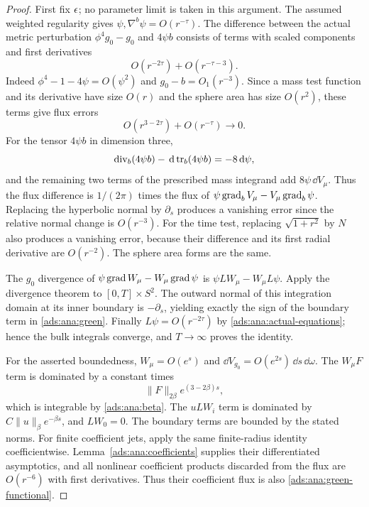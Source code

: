 \begin{proof}
First fix $\epsilon$; no parameter limit is taken in this argument.
The assumed weighted regularity gives
$\psi,\nabla^b\psi=O(r^{-\tau})$.  The difference between the actual
metric perturbation $\phi^4g_0-g_0$ and $4\psi b$ consists of terms
with scaled components and first derivatives
\[
 O(r^{-2\tau})+O(r^{-\tau-3}).
\]
Indeed $\phi^4-1-4\psi=O(\psi^2)$ and
$g_0-b=O_1(r^{-3})$.  Since a mass test function and its derivative
have size $O(r)$ and the sphere area has size $O(r^2)$, these terms
give flux errors
\begin{equation}
 O(r^{3-2\tau})+O(r^{-\tau})\longrightarrow0.
 \label{ads:ana:flux-errors}
\end{equation}
For the tensor $4\psi b$ in dimension three,
\[
 \operatorname{div}_b(4\psi b)-\,\mathrm d\operatorname{tr}_b(4\psi b)=-8\,\mathrm d\psi,
\]
and the remaining two terms of the prescribed mass integrand add
$8\psi\,\dd V_\mu$.  Thus the flux difference is $1/(2\pi)$ times
the flux of $\psi\operatorname{grad}_bV_\mu-V_\mu\operatorname{grad}_b\psi$.
Replacing the hyperbolic normal by $\partial_s$ produces a vanishing
error since the relative normal change is $O(r^{-3})$.
For the time test, replacing $\sqrt{1+r^2}$ by $N$ also produces a
vanishing error, because their difference and its first radial
derivative are $O(r^{-2})$.  The sphere area forms are the same.

The $g_0$ divergence of
$\psi\operatorname{grad} W_\mu-W_\mu\operatorname{grad}\psi$ is
$\psi LW_\mu-W_\mu L\psi$.  Apply the divergence theorem to
$[0,T]\times S^2$.  The outward normal of this integration domain
at its inner boundary is $-\partial_s$, yielding exactly the sign of
the boundary term in \eqref{ads:ana:green}.  Finally
$L\psi=O(r^{-2\tau})$ by \eqref{ads:ana:actual-equations}; hence the
bulk integrals converge, and $T\to\infty$ proves the identity.

For the asserted boundedness, $W_\mu=O(e^s)$ and
$\dd V_{g_0}=O(e^{2s})\,\dd s\,\dd\omega$.
The $W_\mu F$ term is dominated by a constant times
\[
 \|F\|_{2\beta}e^{(3-2\beta)s},
\]
which is integrable by \eqref{ads:ana:beta}.  The $uLW_i$ term is
dominated by $C\|u\|_\beta e^{-\beta s}$, and $LW_0=0$.
The boundary terms are bounded by the stated norms.
For finite coefficient jets, apply the same finite-radius identity
coefficientwise.  Lemma~\ref{ads:ana:coefficients} supplies their
differentiated asymptotics, and all nonlinear coefficient products
discarded from the flux are $O(r^{-6})$ with first derivatives.
Thus their coefficient flux is also
\eqref{ads:ana:green-functional}.
\end{proof}

